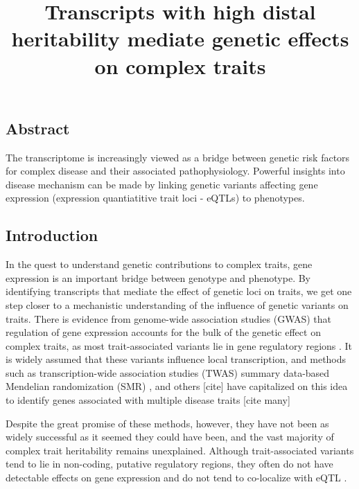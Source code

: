 \documentclass[
]{article}
\title{Transcripts with high distal heritability mediate genetic effects
on complex traits}
\author{}
\date{\vspace{-2.5em}}
\begin{document}
\maketitle

\subsection{Abstract}\label{abstract}

The transcriptome is increasingly viewed as a bridge between genetic
risk factors for complex disease and their associated pathophysiology.
Powerful insights into disease mechanism can be made by linking genetic
variants affecting gene expression (expression quantiatitive trait loci
- eQTLs) to phenotypes.

\subsection{Introduction}\label{introduction}

In the quest to understand genetic contributions to complex traits, gene
expression is an important bridge between genotype and phenotype. By
identifying transcripts that mediate the effect of genetic loci on
traits, we get one step closer to a mechanistic understanding of the
influence of genetic variants on traits. There is evidence from
genome-wide association studies (GWAS) that regulation of gene
expression accounts for the bulk of the genetic effect on complex
traits, as most trait-associated variants lie in gene regulatory regions
\cite{pmid22955828, pmid25363779, pmid21617055, pmid19474294, 
pmid24702953, pmid24316577, pmid27126046}. It is widely assumed that
these variants influence local transcription, and methods such as
transcription-wide association studies (TWAS)
\cite{pmid26258848, pmid27019110, pmid26854917} summary data-based
Mendelian randomization (SMR) \cite{pmid27019110}, and others {[}cite{]}
have capitalized on this idea to identify genes associated with multiple
disease traits {[}cite many{]}

Despite the great promise of these methods, however, they have not been
as widely successful as it seemed they could have been, and the vast
majority of complex trait heritability remains unexplained. Although
trait-associated variants tend to lie in non-coding, putative regulatory
regions, they often do not have detectable effects on gene expression
\cite{pmid32912663} and do not tend to co-localize with eQTL
\cite{pmid36515579, 
pmid37857933}.
\end{document}
